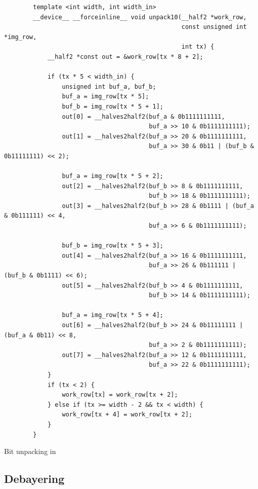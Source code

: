 \begin{listing}[H]
    \begin{verbatim}
        template <int width, int width_in>
        __device__ __forceinline__ void unpack10(__half2 *work_row, 
                                                 const unsigned int *img_row,
                                                 int tx) {
            __half2 *const out = &work_row[tx * 8 + 2];
        
            if (tx * 5 < width_in) {
                unsigned int buf_a, buf_b;
                buf_a = img_row[tx * 5];
                buf_b = img_row[tx * 5 + 1];
                out[0] = __halves2half2(buf_a & 0b1111111111, 
                                        buf_a >> 10 & 0b1111111111);
                out[1] = __halves2half2(buf_a >> 20 & 0b1111111111,
                                        buf_a >> 30 & 0b11 | (buf_b & 0b11111111) << 2);
        
                buf_a = img_row[tx * 5 + 2];
                out[2] = __halves2half2(buf_b >> 8 & 0b1111111111, 
                                        buf_b >> 18 & 0b1111111111);
                out[3] = __halves2half2(buf_b >> 28 & 0b1111 | (buf_a & 0b111111) << 4,
                                        buf_a >> 6 & 0b1111111111);

                buf_b = img_row[tx * 5 + 3];
                out[4] = __halves2half2(buf_a >> 16 & 0b1111111111,
                                        buf_a >> 26 & 0b111111 | (buf_b & 0b1111) << 6);
                out[5] = __halves2half2(buf_b >> 4 & 0b1111111111, 
                                        buf_b >> 14 & 0b1111111111);
        
                buf_a = img_row[tx * 5 + 4];
                out[6] = __halves2half2(buf_b >> 24 & 0b11111111 | (buf_a & 0b11) << 8,
                                        buf_a >> 2 & 0b1111111111);
                out[7] = __halves2half2(buf_a >> 12 & 0b1111111111, 
                                        buf_a >> 22 & 0b1111111111);
            }
            if (tx < 2) {
                work_row[tx] = work_row[tx + 2];
            } else if (tx >= width - 2 && tx < width) {
                work_row[tx + 4] = work_row[tx + 2];
            }
        }
    \end{verbatim}
    \caption{Bit unpacking in \cuda}
\end{listing}

\subsection{Debayering}
\cite{getreuerMalvarHeCutlerLinearImage2011}

